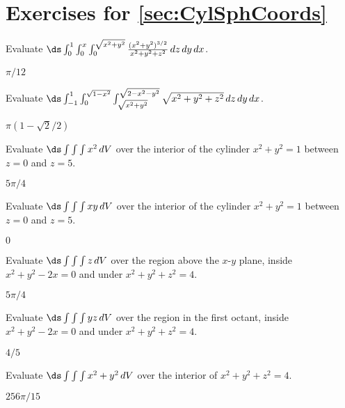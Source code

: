 \section*{Exercises for \ref{sec:CylSphCoords}}

\begin{enumialphparenastyle}

\begin{ex}
Evaluate $\ds\int_{0}^{1}\int_{0}^{x}\int_{0}^{\sqrt{x^2+y^2}}
{(x^2+y^2)^{3/2}\over x^2+y^2+z^2}\,dz\,dy\,dx$.
\begin{sol}
$\pi/12$
\end{sol}
\end{ex}

\begin{ex}
Evaluate $\ds\int_{-1}^{1}\int_{0}^{\sqrt{1-x^2}}
\int_{\sqrt{x^2+y^2}}^{\sqrt{2-x^2-y^2}}\sqrt{x^2+y^2+z^2}\,dz\,dy\,dx$.
\begin{sol}
$\pi(1-\sqrt2/2)$
\end{sol}
\end{ex}

\begin{ex}
Evaluate $\ds\int\int\int x^2\,dV$
over the interior of the cylinder $x^2+y^2=1$ between $z=0$ and $z=5$.
\begin{sol}
$5\pi/4$
\end{sol}
\end{ex}

\begin{ex}
Evaluate $\ds\int\int\int xy\,dV$
over the interior of the cylinder $x^2+y^2=1$ between $z=0$ and $z=5$.
\begin{sol}
$0$
\end{sol}
\end{ex}

\begin{ex}
Evaluate $\ds\int\int\int z\,dV$
over the region above the $x$-$y$ plane, inside $x^2+y^2-2x=0$ and
under $x^2+y^2+z^2=4$.
\begin{sol}
$5\pi/4$
\end{sol}
\end{ex}

\begin{ex}
Evaluate $\ds\int\int\int yz\,dV$
over the region in the first octant, inside $x^2+y^2-2x=0$ and 
under $x^2+y^2+z^2=4$.
\begin{sol}
$4/5$
\end{sol}
\end{ex}

\begin{ex}
Evaluate $\ds\int\int\int x^2+y^2\,dV$
over the interior of $x^2+y^2+z^2=4$.
\begin{sol}
$256\pi/15$
\end{sol}
\end{ex}


\end{enumialphparenastyle}
